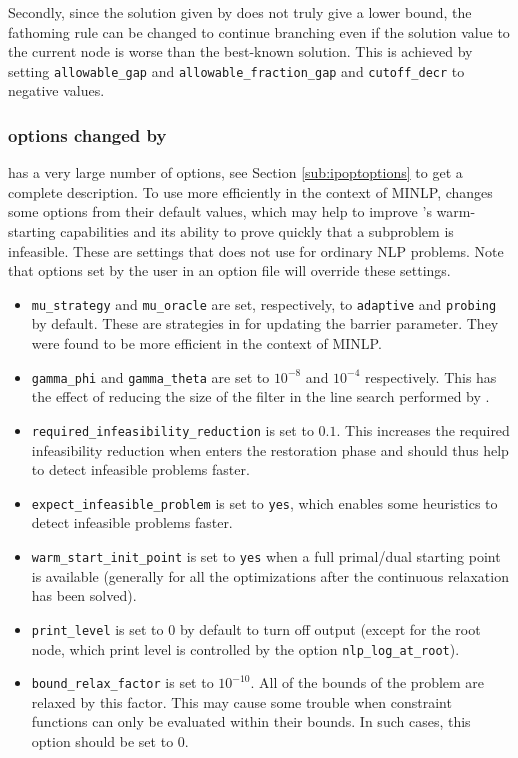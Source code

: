 Secondly, since the solution given by \IPOPT does not truly give a lower bound, the fathoming rule can be changed to continue branching even if the solution value to the current node is worse than the best-known solution.
This is achieved by setting {\tt allowable\_gap}
and {\tt allowable\_fraction\_gap} and {\tt cutoff\_decr} to negative values.

\subsubsection{\IPOPT options changed by \BONMIN}

\IPOPT has a very large number of options, see Section \ref{sub:ipoptoptions} to get a complete description.
To use \IPOPT more efficiently in the context of MINLP,
\BONMIN changes some \IPOPT options from their default values, which may help to improve \IPOPT's warm-starting capabilities and its ability to prove quickly that a subproblem is infeasible.
These are settings that \IPOPT does not use for ordinary NLP problems.
Note that options set by the user in an option file will override these settings.
\begin{itemize}
\vspace{-2ex}
\setlength{\partopsep}{0pt}
\setlength{\itemsep}{0pt}
\setlength{\parskip}{.5ex}
\item {\tt mu\_strategy} and {\tt mu\_oracle} are set, respectively, to
{\tt adaptive} and {\tt probing} by default. These are strategies in \IPOPT
for updating the barrier parameter. They were found to be more efficient in the context of MINLP.

\item {\tt gamma\_phi} and {\tt gamma\_theta} are set to $10^{-8}$ and $10^{-4}$ respectively.
This has the effect of reducing the size of the filter in the line search performed by \IPOPT.

\item {\tt required\_infeasibility\_reduction} is set to $0.1$.
This increases the required infeasibility reduction when \IPOPT enters the
restoration phase and should thus help to detect infeasible problems faster.

\item {\tt expect\_infeasible\_problem} is set to {\tt yes}, which enables some heuristics
to detect infeasible problems faster.

\item {\tt warm\_start\_init\_point} is set to {\tt yes} when a full primal/dual starting
point is available (generally for all the optimizations after the continuous relaxation has been solved).

\item {\tt print\_level} is set to $0$ by default to turn off \IPOPT output (except for the root node, which print level is controlled by the \BONMIN option \texttt{nlp\_log\_at\_root}).

\item \texttt{bound\_relax\_factor} is set to $10^{-10}$. All of the bounds
of the problem are relaxed by this factor. This may cause some trouble
when constraint functions can only be evaluated within their bounds.
In such cases, this option should be set to $0$.
\end{itemize}

